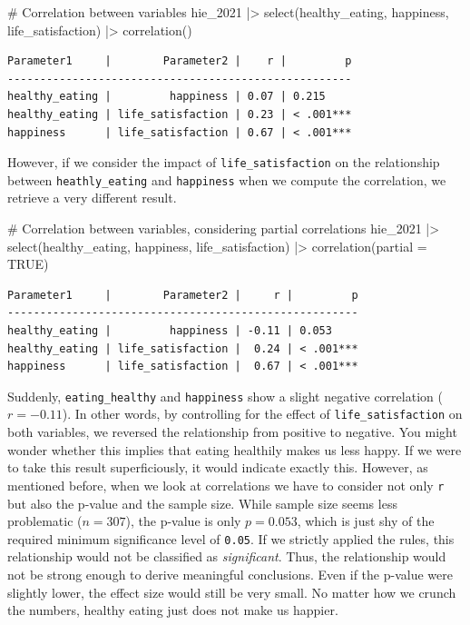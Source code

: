 \documentclass[
  letterpaper,
]{krantz}
\makeatletter
\newenvironment{Shaded}{\begin{snugshade}}{\end{snugshade}}
\newcommand{\AttributeTok}[1]{\textcolor[rgb]{0.40,0.45,0.13}{#1}}
\newcommand{\CommentTok}[1]{\textcolor[rgb]{0.37,0.37,0.37}{#1}}
\newcommand{\ConstantTok}[1]{\textcolor[rgb]{0.56,0.35,0.01}{#1}}
\newcommand{\FunctionTok}[1]{\textcolor[rgb]{0.28,0.35,0.67}{#1}}
\newcommand{\NormalTok}[1]{\textcolor[rgb]{0.00,0.23,0.31}{#1}}
\newcommand{\SpecialCharTok}[1]{\textcolor[rgb]{0.37,0.37,0.37}{#1}}
\newenvironment{kframe}{%
\medskip{}
\setlength{\fboxsep}{.8em}
 \def\at@end@of@kframe{}%
 \ifinner\ifhmode%
  \def\at@end@of@kframe{\end{minipage}}%
  \begin{minipage}{\columnwidth}%
 \fi\fi%
 \def\FrameCommand##1{\hskip\@totalleftmargin \hskip-\fboxsep
 \colorbox{shadecolor}{##1}\hskip-\fboxsep
     \hskip-\linewidth \hskip-\@totalleftmargin \hskip\columnwidth}%
 \MakeFramed {\advance\hsize-\width
   \@totalleftmargin\z@ \linewidth\hsize
   \@setminipage}}%
 {\par\unskip\endMakeFramed%
 \at@end@of@kframe}
\renewenvironment{Shaded}{\begin{kframe}}{\end{kframe}}
\makeatother
\begin{document}
\begin{Shaded}
\begin{Highlighting}[]
\CommentTok{\# Correlation between variables}
\NormalTok{hie\_2021 }\SpecialCharTok{|\textgreater{}}
  \FunctionTok{select}\NormalTok{(healthy\_eating, happiness, life\_satisfaction) }\SpecialCharTok{|\textgreater{}}
  \FunctionTok{correlation}\NormalTok{()}
\end{Highlighting}
\end{Shaded}

\begin{verbatim}
Parameter1     |        Parameter2 |    r |         p
-----------------------------------------------------
healthy_eating |         happiness | 0.07 | 0.215    
healthy_eating | life_satisfaction | 0.23 | < .001***
happiness      | life_satisfaction | 0.67 | < .001***
\end{verbatim}

However, if we consider the impact of \texttt{life\_satisfaction} on the
relationship between \texttt{heathly\_eating} and \texttt{happiness}
when we compute the correlation, we retrieve a very different result.

\begin{Shaded}
\begin{Highlighting}[]
\CommentTok{\# Correlation between variables, considering partial correlations}
\NormalTok{hie\_2021 }\SpecialCharTok{|\textgreater{}}
  \FunctionTok{select}\NormalTok{(healthy\_eating, happiness, life\_satisfaction) }\SpecialCharTok{|\textgreater{}}
  \FunctionTok{correlation}\NormalTok{(}\AttributeTok{partial =} \ConstantTok{TRUE}\NormalTok{)}
\end{Highlighting}
\end{Shaded}

\begin{verbatim}
Parameter1     |        Parameter2 |     r |         p
------------------------------------------------------
healthy_eating |         happiness | -0.11 | 0.053    
healthy_eating | life_satisfaction |  0.24 | < .001***
happiness      | life_satisfaction |  0.67 | < .001***
\end{verbatim}

Suddenly, \texttt{eating\_healthy} and \texttt{happiness} show a slight
negative correlation (\(r = -0.11\)). In other words, by controlling for
the effect of \texttt{life\_satisfaction} on both variables, we reversed
the relationship from positive to negative. You might wonder whether
this implies that eating healthily makes us less happy. If we were to
take this result superficiously, it would indicate exactly this.
However, as mentioned before, when we look at correlations we have to
consider not only \texttt{r} but also the p-value and the sample size.
While sample size seems less problematic (\(n = 307\)), the p-value is
only \(p = 0.053\), which is just shy of the required minimum
significance level of \texttt{0.05}. If we strictly applied the rules,
this relationship would not be classified as \emph{significant}. Thus,
the relationship would not be strong enough to derive meaningful
conclusions. Even if the p-value were slightly lower, the effect size
would still be very small. No matter how we crunch the numbers, healthy
eating just does not make us happier.
\end{document}
